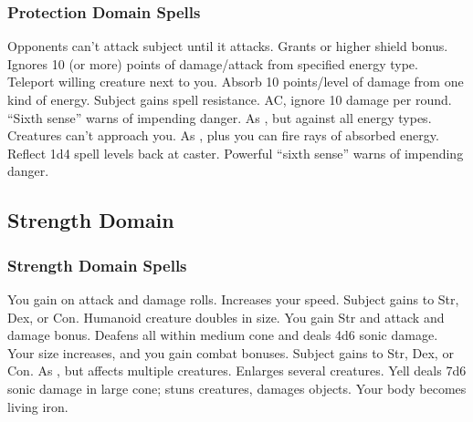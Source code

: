 \subsubsection{Protection Domain Spells}
\begin{spelllist}
   Opponents can't attack subject until it attacks.
   Grants  or higher shield bonus.
   Ignores 10 (or more) points of damage/attack from specified energy type.
   Teleport willing creature next to you.
   Absorb 10 points/level of damage from one kind of energy.
  \spellhead[3]{}
   Subject gains spell resistance.
    AC, ignore 10 damage per round.
  \spellhead[5]{}
   ``Sixth sense'' warns of impending danger.
   As , but against all energy types.
   Creatures can't approach you.
   As , plus you can fire rays of absorbed energy.
   Reflect 1d4 spell levels back at caster.
  \spellhead[8]{}
  \spellhead[8]{}
   Powerful ``sixth sense'' warns of impending danger.
  \spellhead[9]{}
\end{spelllist}

\subsection{Strength Domain}

\subsubsection{Strength Domain Spells}
\begin{spelllist}
   You gain  on attack and damage rolls.
   Increases your speed.
   Subject gains  to Str, Dex, or Con.
  \spellhead[2]{}
   Humanoid creature doubles in size.
  \spellhead[3]{}
   You gain  Str and attack and damage bonus.
   Deafens all within medium cone and deals 4d6 sonic damage.
   Your size increases, and you gain combat bonuses.
   Subject gains  to Str, Dex, or Con.
   As , but affects multiple creatures.
  \spellhead[6]{}
   Enlarges several creatures.
   Yell deals 7d6 sonic damage in large cone; stuns creatures, damages objects.
   Your body becomes living iron.
  \spellhead[8]{}
  \spellhead[9]{}
  \spellhead[9]{} 
\end{spelllist}

